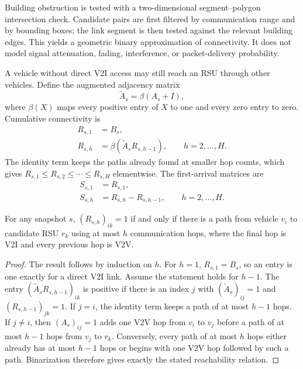 \documentclass[engproc,proceedingpaper,submit,oneauthor]{Definitions/mdpi}
\newcommand{\Atil}{\widetilde{A}}
\newcommand{\bin}[1]{\beta\!\left(#1\right)}
\begin{document}
	Building obstruction is tested with a two-dimensional segment--polygon intersection
	check. Candidate pairs are first filtered by communication range and by bounding
	boxes; the link segment is then tested against the relevant building edges. This
	yields a geometric binary approximation of connectivity. It does not model signal
	attenuation, fading, interference, or packet-delivery probability.
	
	A vehicle without direct V2I access may still reach an RSU through other vehicles.
	Define the augmented adjacency matrix
	\[
	\Atil_s=\bin{A_s+I},
	\]
	where $\beta(X)$ maps every positive entry of $X$ to one and every zero entry to
	zero. Cumulative connectivity is
	\begin{align}
		R_{s,1} &= B_s,\label{eq:r1}\\
		R_{s,h} &= \bin{\Atil_s R_{s,h-1}},\qquad h=2,\ldots,H.\label{eq:rh}
	\end{align}
	The identity term keeps the paths already found at smaller hop counts, which gives
	$R_{s,1}\le R_{s,2}\le\cdots\le R_{s,H}$ elementwise. The first-arrival matrices are
	\begin{align}
		S_{s,1}&=R_{s,1},\\
		S_{s,h}&=R_{s,h}-R_{s,h-1},\qquad h=2,\ldots,H.\label{eq:sh}
	\end{align}
	
	\begin{Proposition}\label{prop:reachability}
		For any snapshot $s$, $(R_{s,h})_{ik}=1$ if and only if there is a path from vehicle
		$v_i$ to candidate RSU $r_k$ using at most $h$ communication hops, where the final
		hop is V2I and every previous hop is V2V.
	\end{Proposition}
	
	\begin{proof}
		The result follows by induction on $h$. For $h=1$, $R_{s,1}=B_s$, so an entry is one
		exactly for a direct V2I link. Assume the statement holds for $h-1$. The entry
		$(\Atil_s R_{s,h-1})_{ik}$ is positive if there is an index $j$ with
		$(\Atil_s)_{ij}=1$ and $(R_{s,h-1})_{jk}=1$. If $j=i$, the identity term keeps a path
		of at most $h-1$ hops. If $j\neq i$, then $(A_s)_{ij}=1$ adds one V2V hop from $v_i$
		to $v_j$ before a path of at most $h-1$ hops from $v_j$ to $r_k$. Conversely, every
		path of at most $h$ hops either already has at most $h-1$ hops or begins with one V2V
		hop followed by such a path. Binarization therefore gives exactly the stated
		reachability relation.
	\end{proof}
	
\end{document}
